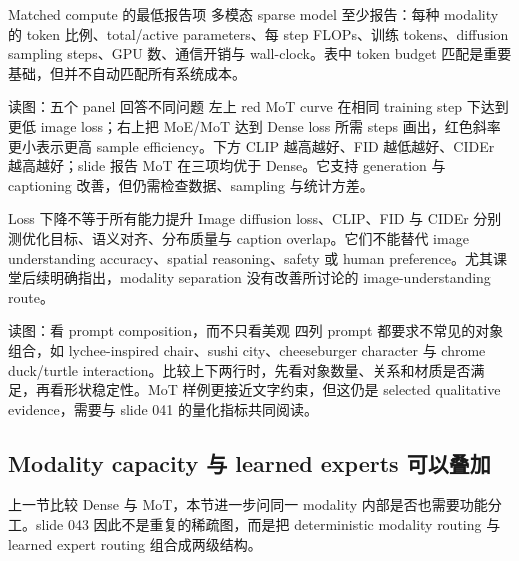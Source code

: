 \begin{importantbox}{Matched compute 的最低报告项}
多模态 sparse model 至少报告：每种 modality 的 token 比例、total/active parameters、每 step FLOPs、训练 tokens、diffusion sampling steps、GPU 数、通信开销与 wall-clock。表中 token budget 匹配是重要基础，但并不自动匹配所有系统成本。
\end{importantbox}


\begin{knowledgebox}{读图：五个 panel 回答不同问题}
左上 red MoT curve 在相同 training step 下达到更低 image loss；右上把 MoE/MoT 达到 Dense loss 所需 steps 画出，红色斜率更小表示更高 sample efficiency。下方 CLIP 越高越好、FID 越低越好、CIDEr 越高越好；slide 报告 MoT 在三项均优于 Dense。它支持 generation 与 captioning 改善，但仍需检查数据、sampling 与统计方差。
\end{knowledgebox}

\begin{warningbox}{Loss 下降不等于所有能力提升}
Image diffusion loss、CLIP、FID 与 CIDEr 分别测优化目标、语义对齐、分布质量与 caption overlap。它们不能替代 image understanding accuracy、spatial reasoning、safety 或 human preference。尤其课堂后续明确指出，modality separation 没有改善所讨论的 image-understanding route。
\end{warningbox}


\begin{knowledgebox}{读图：看 prompt composition，而不只看美观}
四列 prompt 都要求不常见的对象组合，如 lychee-inspired chair、sushi city、cheeseburger character 与 chrome duck/turtle interaction。比较上下两行时，先看对象数量、关系和材质是否满足，再看形状稳定性。MoT 样例更接近文字约束，但这仍是 selected qualitative evidence，需要与 slide 041 的量化指标共同阅读。
\end{knowledgebox}

\subsection{Modality capacity 与 learned experts 可以叠加}

上一节比较 Dense 与 MoT，本节进一步问同一 modality 内部是否也需要功能分工。slide 043 因此不是重复的稀疏图，而是把 deterministic modality routing 与 learned expert routing 组合成两级结构。


